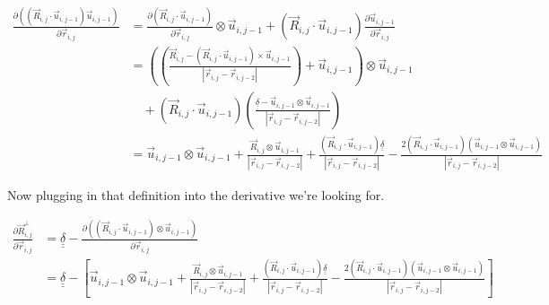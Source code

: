 \documentclass{article}
\renewcommand{\ij}{_{i,j}}
\newcommand{\ijj}{_{i,j-1}}
\newcommand{\ijjj}{_{i,j-2}}
\newcommand{\magn}[1]{\left\vert #1 \right\vert }
\renewcommand{\part}[2]{\frac{\partial #1 }{\partial #2}}
\newcommand{\ten}[1]{\underline{\underline{#1}}}
\newcommand{\rij}{\vec{r} \ij}
\newcommand{\Rij}{\vec{R} \ij}
\newcommand{\rijjj}{\vec{r} \ijjj}
\newcommand{\uijj}{\vec{u} \ijj}
\begin{document}
\begin{align*}
  \part{\left(\left(\vec{R}\ij \cdot \vec{u} \ijj \right) 
  \vec{u} \ijj \right)
  }{\vec{r}\ij} 
  &= 
  \part{\left(\vec{R}\ij \cdot \vec{u} \ijj \right)}{\vec{r}\ij}  
  \otimes
  \vec{u} \ijj  + 
  \left(\vec{R}\ij \cdot \vec{u} \ijj \right)
  \part{\vec{u} \ijj }{\vec{r}\ij}
   \\
  &= 
  \left(
  \left(
  {
  \frac{\Rij - (\Rij \cdot \uijj ) \times \uijj}{\magn{\rij - \rijjj}}
  }
  \right)
  + 
  \vec{u} \ijj 
  \right) 
  \otimes \uijj
  \\
  &
   \quad 
  +  
  \left(\vec{R}\ij \cdot \vec{u} \ijj \right)
  \left(
  {
  \frac{\ten{\delta} - \uijj \otimes \uijj}{\magn{\rij - \rijjj}}
  }
  \right)
  \\
  &=
  \uijj \otimes \uijj
  + 
  \frac{\Rij \otimes \uijj}{\magn{\rij - \rijjj}} 
  +
  \frac{
    \left( 
      \Rij \cdot \uijj   
    \right)
    \ten{\delta}
    }{\magn{\rij - \rijjj}}
  -
  \frac{
    2 \left(
      \Rij \cdot \uijj 
    \right)
    \left(\uijj \otimes \uijj 
    \right)
    }{\magn{\rij - \rijjj}}
\end{align*}

Now plugging in that definition into the derivative we're looking for.

\begin{align*}
  \part{\vec{R}\ij ^ \bot}{\vec{r}\ij}  &=  \ten{\delta} 
  - \part{\left(\left(\vec{R}\ij \cdot \vec{u} \ijj \right) \otimes 
  \vec{u} \ijj \right)
  }{\vec{r}\ij} \\
  &= 
  \boxed{
  \ten{\delta} 
  -
  \left[
  \uijj \otimes \uijj
  + 
  \frac{\Rij \otimes \uijj }{\magn{\rij - \rijjj}} 
  +
  \frac{ \left( 
    \Rij \cdot \uijj
    \right) \ten{\delta}}{\magn{\rij - \rijjj}}
  -
  \frac{
    2 \left(
      \Rij \cdot \uijj 
    \right)
    \left(\uijj \otimes \uijj 
    \right)
    }{\magn{\rij - \rijjj}}
  \right]
  }
\end{align*}
 
\end{document}
